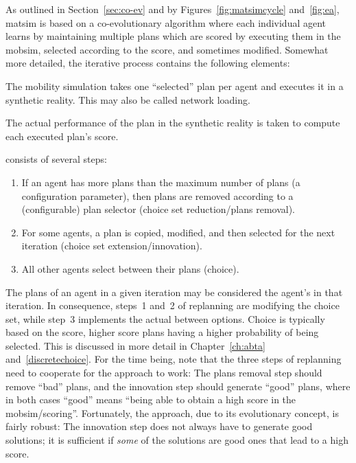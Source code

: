As outlined in Section~\ref{sec:co-ev} and by Figures~\ref{fig:matsimcycle} and~\ref{fig:ea}, \gls{matsim} is based on a co-evolutionary algorithm where each individual agent learns by maintaining multiple plans which are scored by executing them in the mobsim, selected according to the score, and sometimes modified.  Somewhat more detailed, the iterative process contains the following elements:
%
\begin{description}\styleDescription
\item[mobsim] The mobility simulation takes one ``selected'' plan per agent and executes it in a synthetic reality.  This may also be called network loading.

\item [scoring] The actual performance of the plan in the synthetic reality is taken to compute each executed plan's score.

\item [replanning] consists of several steps:
  \begin{enumerate}\styleEnumerate

  \item If an agent has more plans than the maximum number of plans (a configuration parameter), then plans are removed according to a (configurable) plan selector (choice set reduction/plans removal).

    \item For some agents, a plan is copied, modified, and then selected for the next iteration (choice set extension/innovation).

  \item All other agents select between their plans (choice).
  \end{enumerate}
\end{description}

The plans of an agent in a given iteration may be considered the agent's  in that iteration.  In consequence, steps~1 and~2 of replanning are modifying the choice set, while step~3 implements the actual  between options.
%
Choice is typically based on the score, higher score plans having a higher probability of being selected.  
%
This is discussed in more detail in Chapter~\ref{ch:abta} and~\ref{discretechoice}.  For the time being, note that the three steps of replanning need to cooperate for the approach to work: The plans removal step should remove ``bad'' plans, and the innovation step should generate ``good'' plans, where in both cases ``good'' means ``being able to obtain a high score in the mobsim/scoring''.  Fortunately, the approach, due to its evolutionary concept, is fairly robust: The innovation step does not always have to generate good solutions; it is sufficient if \emph{some} of the solutions are good ones that lead to a high score.

